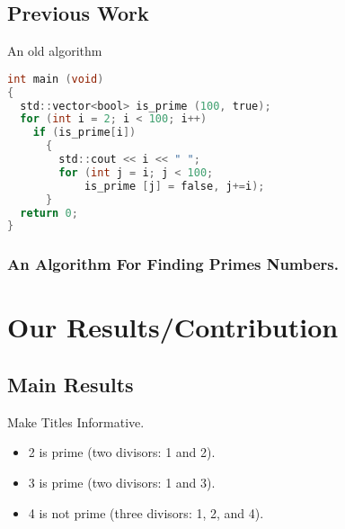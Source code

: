 \documentclass[ucs,9pt]{beamer}
\begin{document}
\subsection{Previous Work}

\begin{frame}[fragile]{An old algorithm}
\begin{lstlisting}[language=C]
int main (void)
{
  std::vector<bool> is_prime (100, true);
  for (int i = 2; i < 100; i++)
    if (is_prime[i])
      {
        std::cout << i << " ";
        for (int j = i; j < 100;
            is_prime [j] = false, j+=i);
      }
  return 0;
}
\end{lstlisting}
\end{frame}

\begin{frame}[fragile]
  \frametitle{An Algorithm For Finding Primes Numbers.}
\begin{semiverbatim}
\end{semiverbatim}
\end{frame}

\section{Our Results/Contribution}

\subsection{Main Results}

\begin{frame}{Make Titles Informative.}
  \begin{example}
    \begin{itemize}
    \item 2 is prime (two divisors: 1 and 2).
    \item 3 is prime (two divisors: 1 and 3).
    \item 4 is not prime (\alert{three} divisors: 1, 2, and 4).
    \end{itemize}
  \end{example}
\end{frame}
\end{document}
